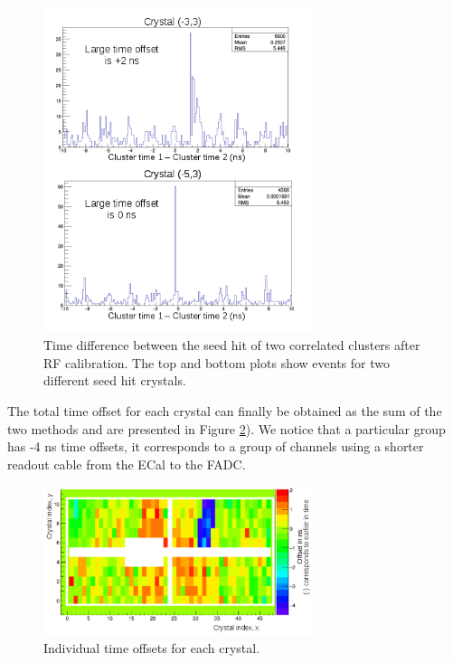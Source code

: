 \documentclass[review]{elsarticle}
\begin{document}
\begin{figure}[ht!]
\centering
\includegraphics[width=0.70\textwidth]{pairsProcedure.png}
\caption{Time difference between the seed hit of two correlated clusters after 
RF calibration. The top and bottom plots show events for two different seed hit crystals.}
\label{LargeOffset}
\end{figure}

The total time offset for each crystal can finally be obtained as the sum of 
the two methods and are presented in Figure \ref{TimeOffset}). We notice that a
particular group has -4 ns time offsets, it corresponds to a group of channels 
using a shorter readout cable from the ECal to the FADC.


\begin{figure}[ht!]
\centering
\includegraphics[width=0.70\textwidth]{TimeOffset.png}
\caption{Individual time offsets for each crystal.}
\label{TimeOffset}
\end{figure}
\end{document}
